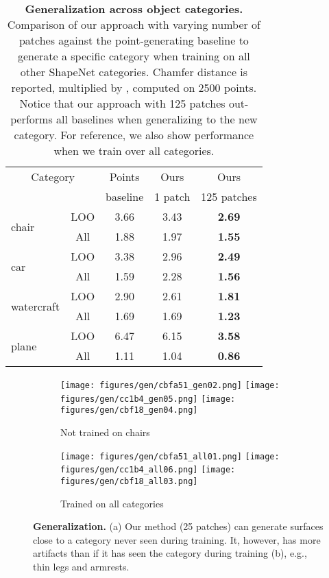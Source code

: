 \documentclass[10pt,twocolumn,letterpaper]{article}
\begin{document}
\begin{table}[t!]
\centering
{
  \begin{tabular}{l|c|c|c|c}
  \hline
  \multicolumn{2}{c|}{Category} & Points  & Ours & Ours   \\
               & &                 baseline &  1 patch &  125 patches  \\
  \hline
  \hline
  \multirow{2}{*}{chair} & LOO &  {3.66} & {3.43} & \textbf{2.69}  \\
   & All &  {1.88} & {1.97}   & \textbf{1.55}\\
     \hline

  \multirow{2}{*}{car} & LOO & {3.38} & {2.96} & \textbf{2.49}   \\
   & All & {1.59} & {2.28} & \textbf{1.56}   \\
     \hline

  \multirow{2}{*}{watercraft} & LOO & {2.90} & {2.61} & \textbf{1.81}   \\
   & All & {1.69} & {1.69} &\textbf{1.23}   \\
     \hline

  \multirow{2}{*}{plane} & LOO & {6.47} & {6.15} & \textbf{3.58} \\
   & All & {1.11} & {1.04} & \textbf{0.86} \\

  \end{tabular} 


}
  \caption{
  {\bf Generalization across object categories.}
Comparison of our approach with varying number of patches against the point-generating baseline to generate a specific category when training on all other ShapeNet categories.
  Chamfer distance is reported, multiplied by , computed on 2500 points.
  Notice that our approach with 125 patches out-performs all baselines when generalizing to the new category.
  For reference, we also show performance when we train over all categories.
}\label{tab:gen_category}
    \vspace{-3mm}
\end{table}
\begin{figure}[t!]
\centering
\begin{subfigure}[b]{0.49\linewidth}
\centering
 \texttt{[image: figures/gen/cbfa51\_gen02.png]}
 \texttt{[image: figures/gen/cc1b4\_gen05.png]}
 \texttt{[image: figures/gen/cbf18\_gen04.png]}
\caption{Not trained on chairs}
\end{subfigure}
\vline
\begin{subfigure}[b]{0.49\linewidth}
\centering
 \texttt{[image: figures/gen/cbfa51\_all01.png]}
 \texttt{[image: figures/gen/cc1b4\_all06.png]}
 \texttt{[image: figures/gen/cbf18\_all03.png]}
\caption{Trained on all categories}
\end{subfigure}
\caption{
{\bf Generalization.} (a) Our method (25 patches) can generate surfaces close to a category never seen during training. It, however, has more artifacts than if it has seen the category during training (b), e.g., thin legs and armrests.
}
  \label{fig:gen}
    \vspace{-3mm}
\end{figure}
\end{document}
